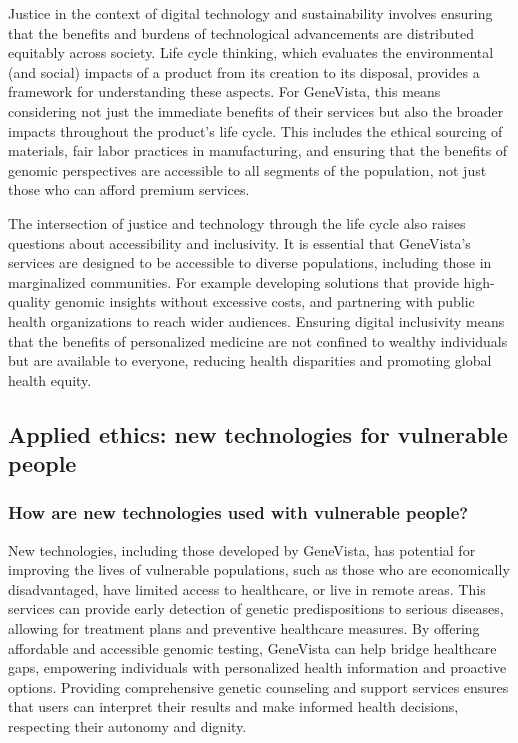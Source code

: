 \documentclass[a4paper]{article}
\begin{document}
Justice in the context of digital technology and sustainability involves ensuring that the benefits and burdens of technological advancements are distributed equitably across society. Life cycle thinking, which evaluates the environmental (and social) impacts of a product from its creation to its disposal, provides a framework for understanding these aspects. For GeneVista, this means considering not just the immediate benefits of their services but also the broader impacts throughout the product’s life cycle. This includes the ethical sourcing of materials, fair labor practices in manufacturing, and ensuring that the benefits of genomic perspectives are accessible to all segments of the population, not just those who can afford premium services.

The intersection of justice and technology through the life cycle also raises questions about accessibility and inclusivity. It is essential that GeneVista’s services are designed to be accessible to diverse populations, including those in marginalized communities. For example developing solutions that provide high-quality genomic insights without excessive costs, and partnering with public health organizations to reach wider audiences. Ensuring digital inclusivity means that the benefits of personalized medicine are not confined to wealthy individuals but are available to everyone, reducing health disparities and promoting global health equity.

\subsection{Applied ethics: new technologies for vulnerable people}

\subsubsection{How are new technologies used with vulnerable people?}

New technologies, including those developed by GeneVista, has potential for improving the lives of vulnerable populations, such as those who are economically disadvantaged, have limited access to healthcare, or live in remote areas. This services can provide early detection of genetic predispositions to serious diseases, allowing for treatment plans and preventive healthcare measures. By offering affordable and accessible genomic testing, GeneVista can help bridge healthcare gaps, empowering individuals with personalized health information and proactive options. Providing comprehensive genetic counseling and support services ensures that users can interpret their results and make informed health decisions, respecting their autonomy and dignity.
\end{document}
